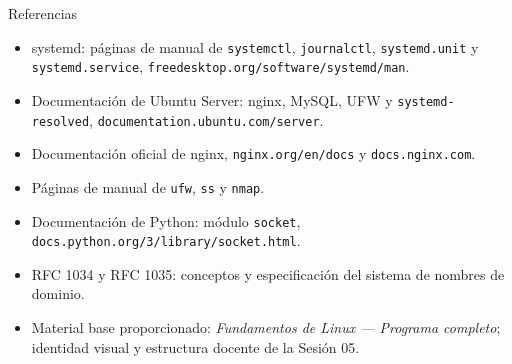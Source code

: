 \documentclass[aspectratio=169,10pt,c]{beamer}
\begin{document}
\begin{frame}{Referencias}
\scriptsize
\begin{itemize}\setlength\itemsep{3pt}
  \item systemd: páginas de manual de \texttt{systemctl}, \texttt{journalctl}, \texttt{systemd.unit} y \texttt{systemd.service}, \texttt{freedesktop.org/software/systemd/man}.
  \item Documentación de Ubuntu Server: nginx, MySQL, UFW y \texttt{systemd-resolved}, \texttt{documentation.ubuntu.com/server}.
  \item Documentación oficial de nginx, \texttt{nginx.org/en/docs} y \texttt{docs.nginx.com}.
  \item Páginas de manual de \texttt{ufw}, \texttt{ss} y \texttt{nmap}.
  \item Documentación de Python: módulo \texttt{socket}, \texttt{docs.python.org/3/library/socket.html}.
  \item RFC 1034 y RFC 1035: conceptos y especificación del sistema de nombres de dominio.
  \item Material base proporcionado: \emph{Fundamentos de Linux — Programa completo}; identidad visual y estructura docente de la Sesión 05.
\end{itemize}
\end{frame}
\end{document}
